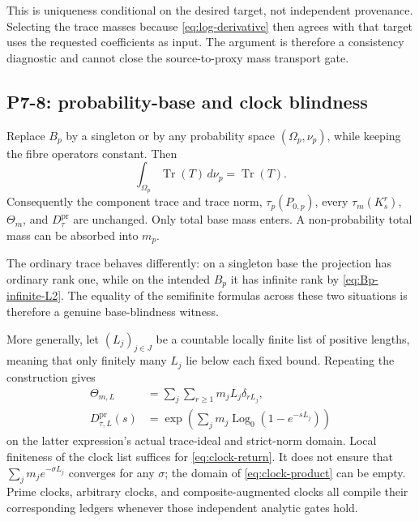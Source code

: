 \documentclass[11pt,a4paper]{article}
\theoremstyle{definition}
\newcommand{\Tr}{\operatorname{Tr}}
\newcommand{\Log}{\operatorname{Log}}
\newcommand{\Dtau}{D^{\mathrm{pr}}_{\tau}}
\begin{document}
This is uniqueness conditional on the desired target, not independent
provenance.  Selecting the trace masses because \eqref{eq:log-derivative}
then agrees with that target uses the requested coefficients as input.  The
argument is therefore a consistency diagnostic and cannot close the
source-to-proxy mass transport gate.

\subsection{P7-8: probability-base and clock blindness}

Replace $B_p$ by a singleton or by any probability space
$(\Omega_p,\nu_p)$, while keeping the fibre operators constant.  Then
\begin{equation}
 \int_{\Omega_p}\Tr(T)\,d\nu_p=\Tr(T).
 \label{eq:base-blind}
\end{equation}
Consequently the component trace and trace norm, $\tau_p(P_{0,p})$, every
$\tau_m(K_s^r)$, $\Theta_m$, and $\Dtau$ are unchanged.  Only total base mass
enters.  A non-probability total mass can be absorbed into $m_p$.

The ordinary trace behaves differently: on a singleton base the projection
has ordinary rank one, while on the intended $B_p$ it has infinite rank by
\eqref{eq:Bp-infinite-L2}.  The equality of the semifinite formulas across
these two situations is therefore a genuine base-blindness witness.

More generally, let $(L_j)_{j\in J}$ be a countable locally finite list of
positive lengths, meaning that only finitely many $L_j$ lie below each fixed
bound.  Repeating the construction gives
\begin{align}
 \Theta_{m,L}
   &=\sum_j\sum_{r\geq1}m_jL_j\delta_{rL_j},
   \label{eq:clock-return}\\
 D^{\mathrm{pr}}_{\tau,L}(s)
   &=\exp\!\left(\sum_jm_j\Log_0(1-e^{-sL_j})\right)
   \label{eq:clock-product}
\end{align}
on the latter expression's actual trace-ideal and strict-norm domain.  Local
finiteness of the clock list suffices for \eqref{eq:clock-return}.  It does
not ensure that $\sum_jm_je^{-\sigma L_j}$ converges for any $\sigma$; the
domain of \eqref{eq:clock-product} can be empty.  Prime clocks, arbitrary
clocks, and composite-augmented clocks all compile their corresponding
ledgers whenever those independent analytic gates hold.
\end{document}
